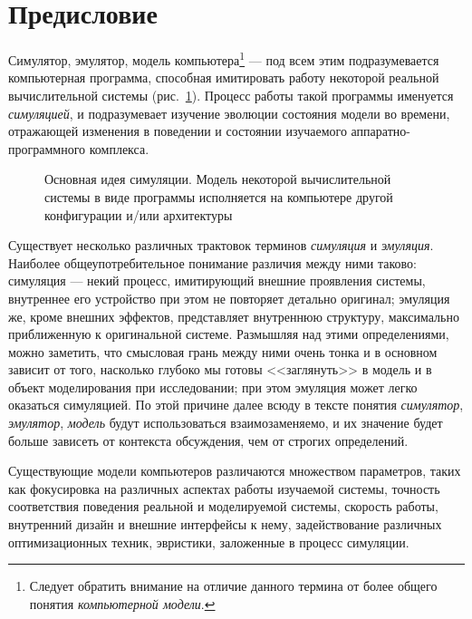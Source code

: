 \chapter*{Предисловие}\label{overview}



Симулятор, эмулятор, модель компьютера\footnote{Следует обратить внимание на отличие данного термина от более общего понятия \emph{компьютерной модели}. } --- под всем этим подразумевается компьютерная программа, способная имитировать работу некоторой реальной вычислительной системы (рис.~\ref{fig:idea}). Процесс работы такой программы именуется \textit{симуляцией}, и подразумевает изучение эволюции состояния модели во времени, отражающей изменения в поведении и состоянии изучаемого аппаратно-программного комплекса.


\setcounter{chapter}{1} %
\setcounter{figure}{-1}
\begin{figure}[tp]
    \centering
    \caption[Основная идея симуляции]{Основная идея симуляции. Модель некоторой вычислительной системы в виде программы исполняется на компьютере другой конфигурации и/или архитектуры}
    \label{fig:idea}
\end{figure}
\setcounter{chapter}{0} %
\setcounter{figure}{0}

Существует несколько различных трактовок терминов \textit{симуляция} и \textit{эмуляция}. Наиболее общеупотребительное понимание различия между ними таково: симуляция --- некий процесс, имитирующий внешние проявления системы, внутреннее его устройство при этом не повторяет детально оригинал; эмуляция же, кроме внешних эффектов, представляет внутреннюю структуру, максимально приближенную к оригинальной системе. Размышляя над этими определениями, можно заметить, что смысловая грань между ними очень тонка и в основном зависит от того, насколько глубоко мы готовы <<заглянуть>> в модель и в объект моделирования при исследовании; при этом эмуляция может легко оказаться симуляцией. По этой причине далее всюду в тексте понятия \textit{симулятор}, \textit{эмулятор}, \textit{модель} будут использоваться взаимозаменяемо, и их значение будет больше зависеть от контекста обсуждения, чем от строгих определений.

Существующие модели компьютеров различаются множеством параметров, таких как фокусировка на различных аспектах работы изучаемой системы, точность соответствия поведения реальной и моделируемой системы, скорость работы, внутренний дизайн и внешние интерфейсы к нему, задействование различных оптимизационных техник, эвристики, заложенные в процесс симуляции.

